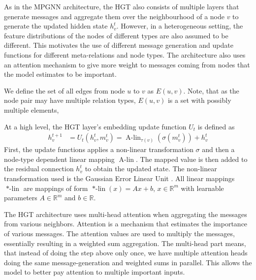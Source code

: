 \documentclass[english, 12pt, a4paper, sci, utf8, a-2b, online]{aaltothesis}
\newcommand{\R}{\mathbb{R}}
\newcommand{\Alin}{\operatorname{A-lin}}
\newcommand{\msg}{\operatorname{Msg}}
\newcommand{\att}{\operatorname{Att}}
\newcommand{\agg}{\operatorname{Aggregate}}
\begin{document}

As in the MPGNN architecture, the HGT also consists of multiple layers that generate messages and aggregate them over the neighbourhood of a node $v$ to generate the updated hidden state $h_v^t$. However, in a heterogeneous setting, the feature distributions of the nodes of different types are also assumed to be different. This motivates the use of different message generation and update functions for different meta-relations and node types. The architecture also uses an attention mechanism to give more weight to messages coming from nodes that the model estimates to be important.

We define the set of all edges from node $u$ to $v$ as $E(u, v)$. Note, that as the node pair may have multiple relation types, $E(u,v)$ is a set with possibly multiple elements,

At a high level, the HGT layer's embedding update function $U_t$ is defined as
\begin{align}
    h^{t+1}_v &= U_t(h_v^t, m_v^t) = \Alin_{\tau(v)}(\sigma(m_v^t))+h_v^t
\end{align}
First, the update functions applies a non-linear transformation $\sigma$ and then a node-type dependent linear mapping $\Alin$. The mapped value is then added to the residual connection $h_v^t$ to obtain the updated state. The non-linear transformation used is the Gaussian Error Linear Unit \cite{gelus}. All linear mappings $\operatorname{*-lin}$ are mappings of form $\operatorname{*-lin}(x) = Ax + b$, $x \in \R^m$ with learnable parameters $A \in \R^m$ and $b \in \R$.

The HGT architecture uses multi-head attention when aggregating the messages from various neighbors. Attention is a mechanism that estimates the importance of various messages. The attention values are used to multiply the messages, essentially resulting in a weighted sum aggregation. The multi-head part means, that instead of doing the step above only once, we have multiple attention heads doing the same message-generation and weighted sums in parallel. This allows the model to better pay attention to multiple important inputs.
\end{document}
